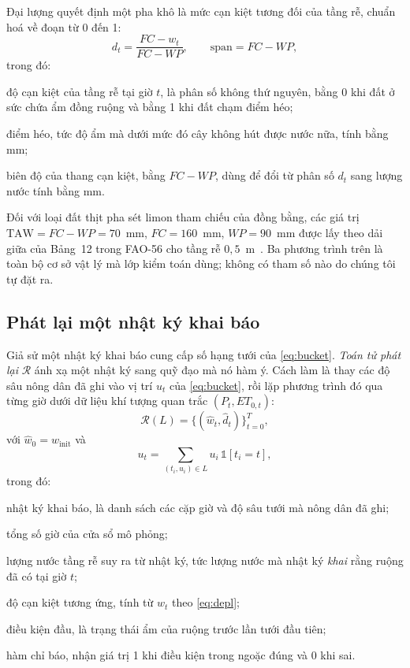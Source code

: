 Đại lượng quyết định một pha khô là mức cạn kiệt tương đối của tầng rễ, chuẩn hoá
về đoạn từ 0 đến 1:
\begin{equation}
d_t=\frac{FC-w_t}{FC-WP},\qquad \mathrm{span}=FC-WP,
\label{eq:depl}
\end{equation}
trong đó:
\begin{symbolist}
\item[$d_t$] độ cạn kiệt của tầng rễ tại giờ $t$, là phân số không thứ nguyên,
  bằng 0 khi đất ở sức chứa ẩm đồng ruộng và bằng 1 khi đất chạm điểm héo;
\item[$WP$] điểm héo, tức độ ẩm mà dưới mức đó cây không hút được nước nữa,
  tính bằng mm;
\item[$\mathrm{span}$] biên độ của thang cạn kiệt, bằng $FC-WP$, dùng để đổi
  từ phân số $d_t$ sang lượng nước tính bằng mm.
\end{symbolist}

Đối với loại đất thịt pha sét limon tham chiếu của đồng bằng, các giá trị
$\mathrm{TAW}=FC-WP=70$~mm, $FC=160$~mm, $WP=90$~mm được lấy theo dải giữa của
Bảng~12 trong FAO-56 cho tầng rễ $0{,}5$~m~\cite{fao56}. Ba phương trình trên là
toàn bộ cơ sở vật lý mà lớp kiểm toán dùng; không có tham số nào do chúng tôi tự
đặt ra.

\subsection{Phát lại một nhật ký khai báo}
\label{sec:replay}

Giả sử một nhật ký khai báo cung cấp số hạng tưới của \eqref{eq:bucket}.
\emph{Toán tử phát lại} $\mathcal{R}$ ánh xạ một nhật ký sang quỹ đạo mà nó hàm ý.
Cách làm là thay các độ sâu nông dân đã ghi vào vị trí $u_t$ của
\eqref{eq:bucket}, rồi lặp phương trình đó qua từng giờ dưới dữ liệu khí tượng
quan trắc $(P_t,ET_{0,t})$:
\begin{equation}
\mathcal{R}(L)=\{(\hat w_t,\hat d_t)\}_{t=0}^{T},
\label{eq:replay}
\end{equation}
với $\hat w_0=w_{\mathrm{init}}$ và
\begin{equation}
u_t=\sum_{(t_i,u_i)\in L}u_i\,\mathbb{1}[t_i=t],
\label{eq:uterm}
\end{equation}
trong đó:
\begin{symbolist}
\item[$L$] nhật ký khai báo, là danh sách các cặp giờ và độ sâu tưới mà nông dân
  đã ghi;
\item[$T$] tổng số giờ của cửa sổ mô phỏng;
\item[$\hat w_t$] lượng nước tầng rễ suy ra từ nhật ký, tức lượng nước mà nhật
  ký \emph{khai} rằng ruộng đã có tại giờ $t$;
\item[$\hat d_t$] độ cạn kiệt tương ứng, tính từ $\hat w_t$ theo
  \eqref{eq:depl};
\item[$\hat w_0=w_{\mathrm{init}}$] điều kiện đầu, là trạng thái ẩm của ruộng
  trước lần tưới đầu tiên;
\item[$\mathbb{1}\lbrack\cdot\rbrack$] hàm chỉ báo, nhận giá trị 1 khi điều kiện trong ngoặc đúng và 0 khi sai.
\end{symbolist}

